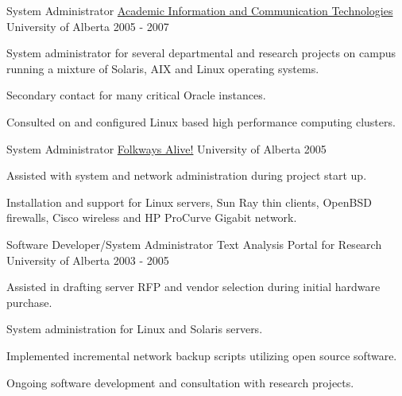 \begin{cventries}
  \cventry
    {System Administrator} %
    {\href{https://ist.ualberta.ca/}{Academic Information and Communication Technologies}} %
    {University of Alberta} %
    {2005 - 2007} %
    {
      \begin{cvitems} %
        \item {System administrator for several departmental and research projects on campus running a mixture of Solaris, AIX and Linux operating systems.}
        \item {Secondary contact for many critical Oracle instances.}
        \item {Consulted on and configured Linux based high performance computing clusters.}
      \end{cvitems}
    }

  \cventry
    {System Administrator} %
    {\href{http://folkwaysalive.ualberta.ca/}{Folkways Alive!}} %
    {University of Alberta} %
    {2005} %
    {
      \begin{cvitems} %
        \item {Assisted with system and network administration during project start up.}
        \item {Installation and support for Linux servers, Sun Ray thin clients, OpenBSD firewalls, Cisco wireless and HP ProCurve Gigabit network.}
      \end{cvitems}
    }

  \cventry
    {Software Developer/System Administrator} %
    {Text Analysis Portal for Research} %
    {University of Alberta} %
    {2003 - 2005} %
    {
      \begin{cvitems} %
        \item {Assisted in drafting server RFP and vendor selection during initial hardware purchase.}
        \item {System administration for Linux and Solaris servers.}
        \item {Implemented incremental network backup scripts utilizing open source software.}
        \item{Ongoing software development and consultation with research projects.}
      \end{cvitems}
    }


\end{cventries}
